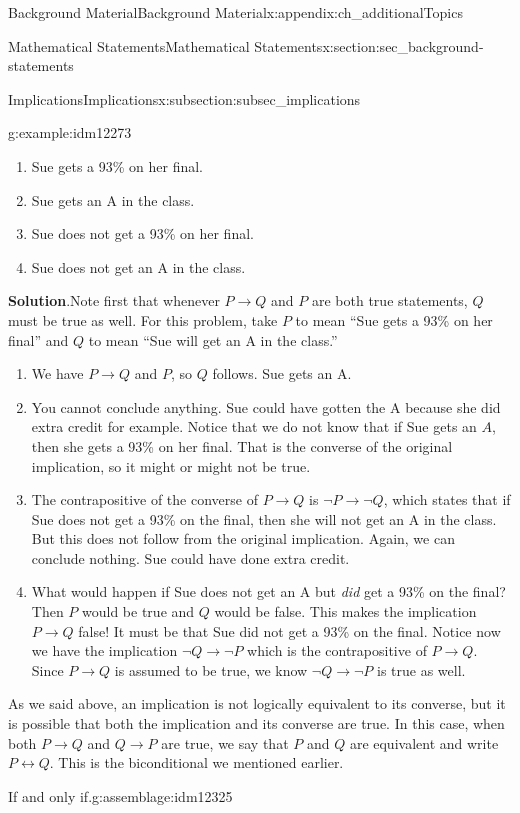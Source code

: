 \documentclass[oneside,10pt,]{book}
\numberwithin{equation}{chapter}
\def\iff{\leftrightarrow}
\def\imp{\rightarrow}
\begin{document}
\begin{appendixptx}{Background Material}{}{Background Material}{}{}{x:appendix:ch_additionalTopics}
\begin{sectionptx}{Mathematical Statements}{}{Mathematical Statements}{}{}{x:section:sec_background-statements}
\begin{subsectionptx}{Implications}{}{Implications}{}{}{x:subsection:subsec_implications}
\begin{example}{}{g:example:idm12273}
\begin{enumerate}
\item{}Sue gets a 93\% on her final.%
\item{}Sue gets an A in the class.%
\item{}Sue does not get a 93\% on her final.%
\item{}Sue does not get an A in the class.%
\end{enumerate}
%
\par\smallskip%
\noindent\textbf{Solution}.\hypertarget{g:solution:idm12286}{}\quad{}Note first that whenever \(P \imp Q\) and \(P\) are both true statements, \(Q\) must be true as well. For this problem, take \(P\) to mean ``Sue gets a 93\% on her final'' and \(Q\) to mean ``Sue will get an A in the class.''%
\par
%
\begin{enumerate}
\item{}We have \(P \imp Q\) and \(P\), so \(Q\) follows. Sue gets an A.%
\item{}You cannot conclude anything. Sue could have gotten the A because she did extra credit for example. Notice that we do not know that if Sue gets an \(A\), then she gets a 93\% on her final. That is the converse of the original implication, so it might or might not be true.%
\item{}The contrapositive of the converse of \(P \imp Q\) is \(\neg P \imp \neg Q\), which states that if Sue does not get a 93\% on the final, then she will not get an A in the class. But this does not follow from the original implication. Again, we can conclude nothing. Sue could have done extra credit.%
\item{}What would happen if Sue does not get an A but \emph{did} get a 93\% on the final? Then \(P\) would be true and \(Q\) would be false. This makes the implication \(P \imp Q\) false! It must be that Sue did not get a 93\% on the final. Notice now we have the implication \(\neg Q \imp \neg P\) which is the contrapositive of \(P \imp Q\). Since \(P \imp Q\) is assumed to be true, we know \(\neg Q \imp \neg P\) is true as well.%
\end{enumerate}
%
\end{example}
As we said above, an implication is not logically equivalent to its converse, but it is possible that both the implication and its converse are true. In this case, when both \(P \imp Q\) and \(Q \imp P\) are true, we say that \(P\) and \(Q\) are equivalent and write \(P \iff Q\). This is the biconditional we mentioned earlier.%
\begin{assemblage}{If and only if.}{g:assemblage:idm12325}%

\end{assemblage}
\end{subsectionptx}
\end{sectionptx}
\end{appendixptx}
\end{document}
